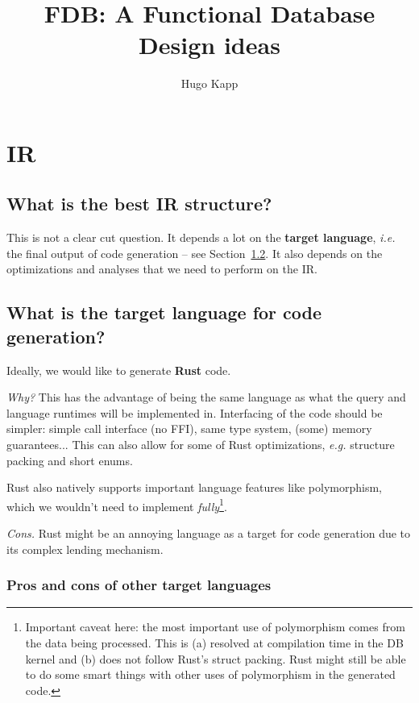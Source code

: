 \documentclass[10pt,a4paper]{article}
\title{FDB: A Functional Database \\ Design ideas}
\author{Hugo Kapp}
\newcommand{\ie}[0]{\textit{i.e.}}
\newcommand{\eg}[0]{\textit{e.g.}}
\begin{document}
\maketitle

\section{IR}

\subsection{What is the best IR structure?}

This is not a clear cut question.
It depends a lot on the \textbf{target language}, \ie{} the final output of code generation -- see Section~\ref{sec:targetlanguage}.
It also depends on the optimizations and analyses that we need to perform on the IR.

\subsection{What is the target language for code generation?}
\label{sec:targetlanguage}

Ideally, we would like to generate \textbf{Rust} code.

\textit{Why?}
This has the advantage of being the same language as what the query and language runtimes will be implemented in.
Interfacing of the code should be simpler: simple call interface (no FFI), same type system, (some) memory guarantees...
This can also allow for some of Rust optimizations, \eg{} structure packing and short enums.

Rust also natively supports important language features like polymorphism, which we wouldn't need to implement \textit{fully}\footnote{
	Important caveat here: the most important use of polymorphism comes from the data being processed.
	This is (a) resolved at compilation time in the DB kernel and (b) does not follow Rust's struct packing.
	Rust might still be able to do some smart things with other uses of polymorphism in the generated code.
}.

\textit{Cons.}
Rust might be an annoying language as a target for code generation due to its complex lending mechanism.

\subsubsection{Pros and cons of other target languages}
\end{document}
